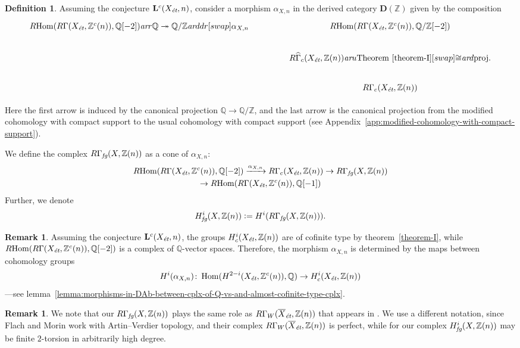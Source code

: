 \documentclass[leqno,12pt]{article}
\theoremstyle{plain}
\theoremstyle{definition}
\newtheorem{definition}[theorem]{\indent\sc Definition}
\newtheorem{remark}[theorem]{\indent\sc Remark}
\DeclareMathOperator{\Hom}{Hom}
\newcommand{\ZZ}{\mathbb{Z}}
\newcommand{\QQ}{\mathbb{Q}}
\newcommand{\dfn}{\mathrel{\mathop:}=}
\newcommand{\et}{\text{\it \'{e}t}}
\newcommand{\fg}{\text{\it fg}}
\newcommand{\ar}{\text{\it ar}}
\newcommand{\RHom}{R\!\Hom}
\begin{document}
\begin{definition}
  \label{def:RGamma-fg}
  Assuming the conjecture $\mathbf{L}^c (X_\et,n)$, consider a morphism
  $\alpha_{X,n}$ in the derived category $\mathbf{D} (\ZZ)$ given by the
  composition
  \[ \begin{tikzcd}[column sep=4em]
    \RHom (R\Gamma (X_\et, \ZZ^c (n)), \QQ[-2]) \ar{r}{\QQ \twoheadrightarrow \QQ/\ZZ}\ar{ddr}[swap]{\alpha_{X,n}} & \RHom (R\Gamma (X_\et, \ZZ^c (n)), \QQ/\ZZ[-2]) \\
    & R\widehat{\Gamma}_c (X_\et, \ZZ (n)) \ar{u}{\text{Theorem \ref{theorem-I}}}[swap]{\cong} \ar{d}{\text{proj.}} \\
    & R\Gamma_c (X_\et, \ZZ (n))
  \end{tikzcd} \]

  Here the first arrow is induced by the canonical projection $\QQ \to \QQ/\ZZ$,
  and the last arrow is the canonical projection from the modified cohomology
  with compact support to the usual cohomology with compact support
  (see Appendix~\ref{app:modified-cohomology-with-compact-support}).

  We define the complex $R\Gamma_\fg (X, \ZZ(n))$ as a cone of $\alpha_{X,n}$:
  \begin{multline*}
    \RHom (R\Gamma (X_\et, \ZZ^c (n)), \QQ [-2]) \xrightarrow{\alpha_{X,n}}
    R\Gamma_c (X_\et, \ZZ (n)) \to
    R\Gamma_\fg (X, \ZZ(n)) \\
    \to \RHom (R\Gamma (X_\et, \ZZ^c (n)), \QQ [-1])
  \end{multline*}
  Further, we denote
  $$H^i_\fg (X, \ZZ (n)) \dfn H^i (R\Gamma_\fg (X, \ZZ (n))).$$
\end{definition}

\begin{remark}
  \label{rmk:alpha-X-n-determined-by-cohomology}
  Assuming the conjecture $\mathbf{L}^c (X_\et, n)$, the groups
  $H^i_c (X_\et, \ZZ (n))$ are of cofinite type by theorem~\ref{theorem-I},
  while $\RHom (R\Gamma (X_\et, \ZZ^c (n)), \QQ [-2])$ is a complex of
  $\QQ$-vector spaces. Therefore, the morphism $\alpha_{X,n}$ is determined by
  the maps between cohomology groups
  \[ H^i (\alpha_{X,n})\colon
    \Hom (H^{2-i} (X_\et, \ZZ^c (n)), \QQ) \to
    H^i_c (X_\et, \ZZ (n)) \]
  ---see lemma~\ref{lemma:morphisms-in-DAb-between-cplx-of-Q-vs-and-almost-cofinite-type-cplx}.
\end{remark}

\begin{remark}
  We note that our $R\Gamma_\fg (X, \ZZ (n))$ plays the same role as
  $R\Gamma_W (\overline{X}_\et, \ZZ (n))$ that appears in
  \cite[Definition~3.6]{Flach-Morin-2018}. We use a different notation, since
  Flach and Morin work with Artin--Verdier topology, and their complex
  $R\Gamma_W (\overline{X}_\et, \ZZ (n))$ is perfect, while for our complex
  $H^i_\fg (X, \ZZ (n))$ may be finite $2$-torsion in arbitrarily high degree.
\end{remark}
\end{document}
